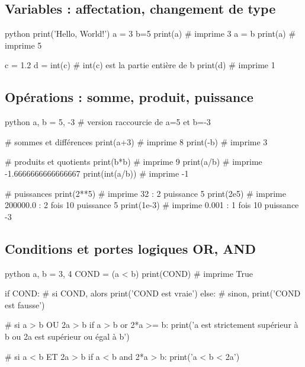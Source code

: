 \newif\ifdys
				\dystrue
				\dysfalse

\newif\ifsolutions
				\solutionstrue
				\solutionsfalse



\AdvanceDate[0]


\pagestyle{fancy}
\fancyhead[C]{\textbf{Algorithmique : Glossaire \ifsolutions \, -- Solutions  \fi}}
\fancyhead[R]{\today}

\subsection*{Variables : affectation, changement de type}

\begin{mintedbox}{python}
print('Hello, World!')
a = 3
b=5
print(a) # imprime 3
a = b
print(a) # imprime 5

c = 1.2
d = int(c) # int(c) est la partie entière de b
print(d) # imprime 1
\end{mintedbox}

\subsection*{Opérations : somme, produit, puissance}

\begin{mintedbox}{python}
a, b = 5, -3 # version raccourcie de a=5 et b=-3

# sommes et différences
print(a+3) # imprime 8
print(-b) # imprime 3

# produits et quotients
print(b*b) # imprime 9
print(a/b) # imprime -1.6666666666666667
print(int(a/b)) # imprime -1

# puissances
print(2**5) # imprime 32 : 2 puissance 5
print(2e5) # imprime 200000.0 : 2 fois 10 puissance 5
print(1e-3) # imprime 0.001 : 1 fois 10 puissance -3
\end{mintedbox}

\subsection*{Conditions et portes logiques OR, AND}

\begin{mintedbox}{python}
a, b = 3, 4
COND = (a < b)
print(COND) # imprime True

if COND: # si COND, alors
	print('COND est vraie')
else: # sinon,
	print('COND est fausse')

# si a > b OU 2a > b
if a > b or 2*a >= b:
	print('a est strictement supérieur à b ou 2a est supérieur ou égal à b')

# si a < b ET 2a > b
if a < b and 2*a > b:
	print('a < b < 2a')
\end{mintedbox}

